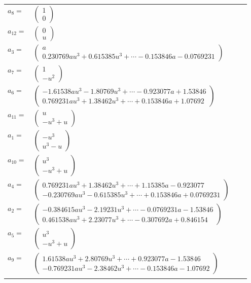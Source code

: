 \documentclass[1p]{elsarticle_modified}
\theoremstyle{definition}
\begin{document}
\begin{tabular}{m{7pt} m{180pt} m{7pt} m{180pt} }
\flushright $a_{8}=$&$\begin{pmatrix}1\\0\end{pmatrix}$ \\
\flushright $a_{12}=$&$\begin{pmatrix}0\\u\end{pmatrix}$ \\
\flushright $a_{3}=$&$\begin{pmatrix}a\\0.230769 a u^{3}+0.615385 u^{3}+\cdots-0.153846 a-0.0769231\end{pmatrix}$ \\
\flushright $a_{7}=$&$\begin{pmatrix}1\\- u^2\end{pmatrix}$ \\
\flushright $a_{6}=$&$\begin{pmatrix}-1.61538 a u^{3}-1.80769 u^{3}+\cdots-0.923077 a+1.53846\\0.769231 a u^{3}+1.38462 u^{3}+\cdots+0.153846 a+1.07692\end{pmatrix}$ \\
\flushright $a_{11}=$&$\begin{pmatrix}u\\- u^3+u\end{pmatrix}$ \\
\flushright $a_{1}=$&$\begin{pmatrix}- u^3\\u^3- u\end{pmatrix}$ \\
\flushright $a_{10}=$&$\begin{pmatrix}u^3\\- u^3+u\end{pmatrix}$ \\
\flushright $a_{4}=$&$\begin{pmatrix}0.769231 a u^{3}+1.38462 u^{3}+\cdots+1.15385 a-0.923077\\-0.230769 a u^{3}-0.615385 u^{3}+\cdots+0.153846 a+0.0769231\end{pmatrix}$ \\
\flushright $a_{2}=$&$\begin{pmatrix}-0.384615 a u^{3}-2.19231 u^{3}+\cdots-0.0769231 a-1.53846\\0.461538 a u^{3}+2.23077 u^{3}+\cdots-0.307692 a+0.846154\end{pmatrix}$ \\
\flushright $a_{5}=$&$\begin{pmatrix}u^3\\- u^3+u\end{pmatrix}$ \\
\flushright $a_{9}=$&$\begin{pmatrix}1.61538 a u^{3}+2.80769 u^{3}+\cdots+0.923077 a-1.53846\\-0.769231 a u^{3}-2.38462 u^{3}+\cdots-0.153846 a-1.07692\end{pmatrix}$\\&\end{tabular}
\end{document}
